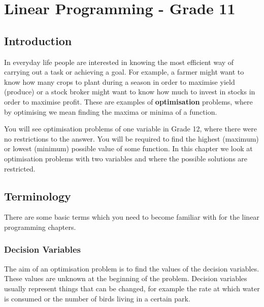 \chapter{Linear Programming - Grade 11}


\section{Introduction}
In everyday life people are interested in knowing the most efficient way of
carrying out a task or achieving a goal. For example, a farmer might want to
know how many crops to plant during a season in order to maximise yield
(produce) or a stock broker might want to know how much to invest in stocks in order to maximise profit. These are examples of \textbf{optimisation} problems, where by optimising we mean finding the maxima or minima of a function. 

You will see optimisation problems of one variable in Grade 12, %
where there were no restrictions to the answer. You will be required to find the highest (maximum) or lowest (minimum) possible value of some function. In this chapter we look at optimisation problems with two variables and where the possible solutions are restricted. 

\section{Terminology}
There are some basic terms which you need to become familiar with for the linear programming chapters.

\subsection{Decision Variables}
The aim of an optimisation problem is to find the values of the decision variables. These values are unknown at the beginning of the problem. Decision variables usually represent things that can be changed, for example the rate at which water is consumed or the number of birds living in a certain park.

